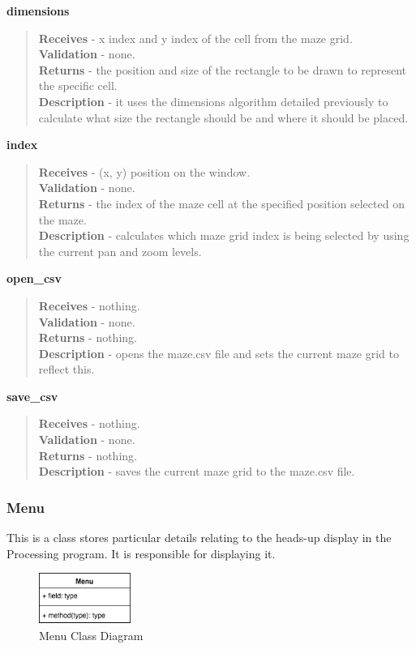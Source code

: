 \documentclass[titlepage]{article}
\begin{document}
\textbf{dimensions}
\begin{quote}
\textbf{Receives} - x index and y index of the cell from the maze grid. \\
\textbf{Validation} - none.\\
\textbf{Returns} - the position and size of the rectangle to be drawn to represent the specific cell. \\
\textbf{Description} - it uses the dimensions algorithm detailed previously to calculate what size the rectangle should be and where it should be placed.
\end{quote}

\textbf{index}
\begin{quote}
\textbf{Receives} - (x, y) position on the window. \\
\textbf{Validation} - none.\\
\textbf{Returns} - the index of the maze cell at the specified position selected on the maze. \\
\textbf{Description} - calculates which maze grid index is being selected by using the current pan and zoom levels.
\end{quote}

\textbf{open\_csv}
\begin{quote}
\textbf{Receives} - nothing. \\
\textbf{Validation} - none.\\
\textbf{Returns} - nothing. \\
\textbf{Description} - opens the maze.csv file and sets the current maze grid to reflect this.
\end{quote}

\textbf{save\_csv}
\begin{quote}
\textbf{Receives} - nothing. \\
\textbf{Validation} - none.\\
\textbf{Returns} - nothing. \\
\textbf{Description} - saves the current maze grid to the maze.csv file.
\end{quote}

\subsubsection{Menu}
This is a class stores particular details relating to the heads-up display in the Processing program. It is responsible for displaying it. 

\begin{figure}[H]
  \centering
  \includegraphics[width=3cm]{Menucd.png}
  \caption{Menu Class Diagram}
  \label{fig:dijk}
\end{figure}
\end{document}
